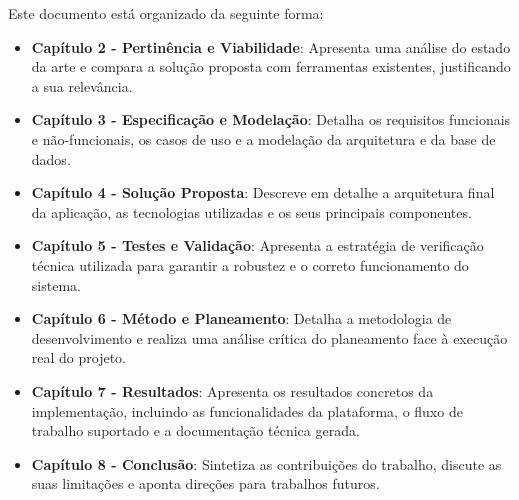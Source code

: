 Este documento está organizado da seguinte forma:

\begin{itemize}
    \item \textbf{Capítulo 2 - Pertinência e Viabilidade}: Apresenta uma análise do estado da arte e compara a solução proposta com ferramentas existentes, justificando a sua relevância.

    \item \textbf{Capítulo 3 - Especificação e Modelação}: Detalha os requisitos funcionais e não-funcionais, os casos de uso e a modelação da arquitetura e da base de dados.

    \item \textbf{Capítulo 4 - Solução Proposta}: Descreve em detalhe a arquitetura final da aplicação, as tecnologias utilizadas e os seus principais componentes.

    \item \textbf{Capítulo 5 - Testes e Validação}: Apresenta a estratégia de verificação técnica utilizada para garantir a robustez e o correto funcionamento do sistema.

    \item \textbf{Capítulo 6 - Método e Planeamento}: Detalha a metodologia de desenvolvimento e realiza uma análise crítica do planeamento face à execução real do projeto.

    \item \textbf{Capítulo 7 - Resultados}: Apresenta os resultados concretos da implementação, incluindo as funcionalidades da plataforma, o fluxo de trabalho suportado e a documentação técnica gerada.

    \item \textbf{Capítulo 8 - Conclusão}: Sintetiza as contribuições do trabalho, discute as suas limitações e aponta direções para trabalhos futuros.
\end{itemize}
